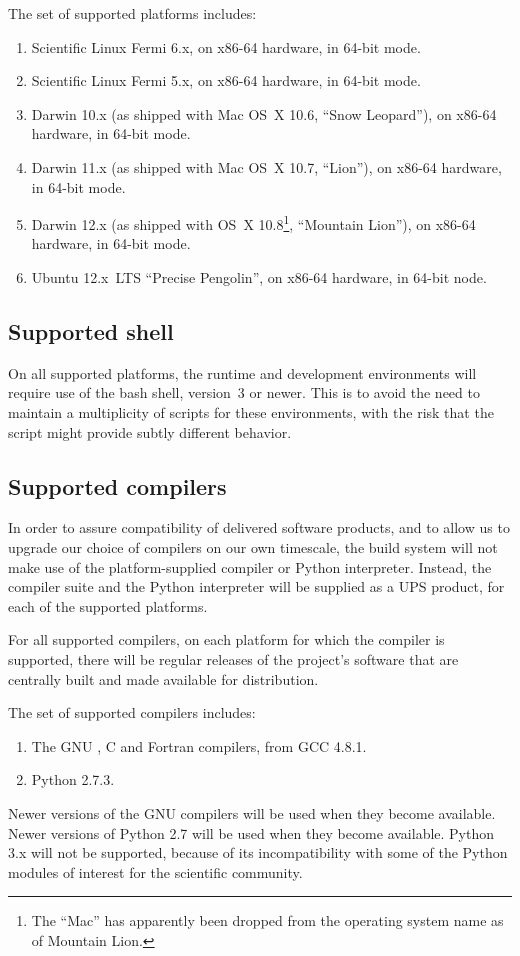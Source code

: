 \documentclass[draftmode,draftwater]{memarticle}
\begin{document}
The set of supported platforms includes:
\begin{enumerate}
\item Scientific Linux Fermi 6.x, on x86-64 hardware, in 64-bit mode.
\item Scientific Linux Fermi 5.x, on x86-64 hardware, in 64-bit mode.
\item Darwin 10.x (as shipped with Mac OS~X 10.6, ``Snow Leopard''), on
  x86-64 hardware, in 64-bit mode.
\item Darwin 11.x (as shipped with Mac OS~X 10.7, ``Lion''), on x86-64
  hardware, in 64-bit mode.
\item Darwin 12.x (as shipped with OS~X 10.8\footnote{The ``Mac'' has
    apparently been dropped from the operating system name as of
    Mountain Lion.}, ``Mountain Lion''), on x86-64 hardware, in 64-bit
  mode.
\item Ubuntu 12.x~LTS ``Precise Pengolin'', on x86-64 hardware, in
  64-bit node.
\end{enumerate}

\subsection{Supported shell}

On all supported platforms, the runtime and development environments
will require use of the bash shell, version~3 or newer. This is to avoid
the need to maintain a multiplicity of scripts for these environments,
with the risk that the script might provide subtly different behavior.

\subsection{Supported compilers}

In order to assure compatibility of delivered software products, and to
allow us to upgrade our choice of compilers on our own timescale, the
build system will not make use of the platform-supplied compiler or
Python interpreter. Instead, the compiler suite and the Python
interpreter will be supplied as a UPS product, for each of the supported
platforms.

For all supported compilers, on each platform for which the compiler is
supported, there will be regular releases of the project's software that
are centrally built and made available for distribution.

The set of supported compilers includes:
\begin{enumerate}
\item The GNU \cpp{}, C and Fortran compilers, from GCC 4.8.1.
\item Python 2.7.3.
\end{enumerate}
Newer versions of the GNU compilers will be used when they become
available. Newer versions of Python 2.7 will be used when they become
available. Python 3.x will not be supported, because of its
incompatibility with some of the Python modules of interest for the
scientific community.
\end{document}
